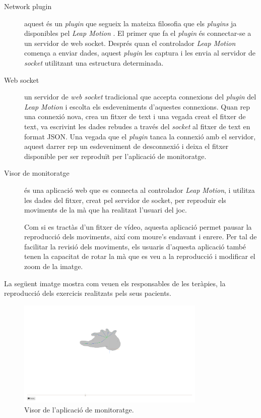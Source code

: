 \documentclass[12pt,a4paper,catalan]{article}
\begin{document}
	\begin{description}
		\item[Network plugin] aquest és un \textit{plugin} que segueix la mateixa filosofia que els \textit{plugins} ja disponibles pel \textit{Leap Motion} \cite{leapjsplugins}. El primer que fa el \textit{plugin} és connectar-se a un servidor de web socket. Després quan el controlador \textit{Leap Motion} comença a enviar dades, aquest \textit{plugin} les captura i les envia al servidor de \textit{socket} utilitzant una estructura determinada.
		\item[Web socket] un servidor de \textit{web socket} tradicional que accepta connexions del \textit{plugin} del \textit{Leap Motion} i escolta els esdeveniments d'aquestes connexions. Quan rep una connexió nova, crea un fitxer de text i una vegada creat el fitxer de text, va escrivint les dades rebudes a través del \textit{socket} al fitxer de text en format JSON. Una vegada que el \textit{plugin} tanca la connexió amb el servidor, aquest darrer rep un esdeveniment de desconnexió i deixa el fitxer disponible per ser reproduït per l'aplicació de monitoratge.
		\item[Visor de monitoratge] és una aplicació web que es connecta al controlador \textit{Leap Motion}, i utilitza les dades del fitxer, creat pel servidor de socket, per reproduir els moviments de la mà que ha realitzat l'usuari del joc.
		
		Com si es tractàs d'un fitxer de vídeo, aquesta aplicació permet pausar la reproducció dels moviments, així com moure's endavant i enrere. Per tal de facilitar la revisió dels moviments, els usuaris d'aquesta aplicació també tenen la capacitat de rotar la mà que es veu a la reproducció i modificar el zoom de la imatge.
	\end{description}
	La següent imatge mostra com veuen els responsables de les teràpies, la reproducció dels exercicis realitzats pels seus pacients.
	\begin{figure}[H]
		\includegraphics[width=0.8\textwidth,keepaspectratio]{playback-simple.png}
		\centering
		\caption{Visor de l'aplicació de monitoratge.}
		\label{fig:playback-simple}
	\end{figure}
\end{document}
